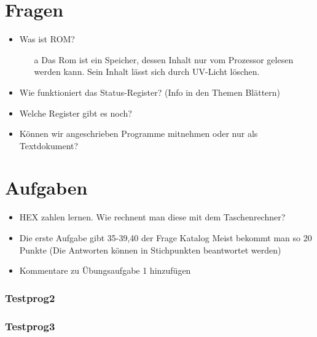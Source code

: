 \documentclass[
  ngerman
  ,12pt
  ,pdftex
]{article}
\begin{document}
  \section{Fragen}
  \begin{itemize}
    \item Was ist ROM?
    \begin{itemize}
      \item [a] Das Rom ist ein Speicher, dessen Inhalt nur vom Prozessor gelesen werden kann. Sein Inhalt lässt sich durch UV-Licht löschen.
    \end{itemize}
    \item Wie funktioniert das Status-Register? (Info in den Themen Blättern)
    \item Welche Register gibt es noch?
    \item Können wir angeschrieben Programme mitnehmen oder nur als Textdokument?
  \end{itemize}
  \section{Aufgaben}
  \begin{itemize}
    \item HEX zahlen lernen. Wie rechnent man diese mit dem Taschenrechner?
    \item Die erste Aufgabe gibt 35-39,40 der Frage Katalog
    Meist bekommt man so 20 Punkte (Die Antworten können in Stichpunkten beantwortet werden)
    \item Kommentare zu Übungsaufgabe 1 hinzufügen
  \end{itemize}


\newpage





\newpage






\subsubsection*{Testprog2}

\subsubsection*{Testprog3}

\end{document}
